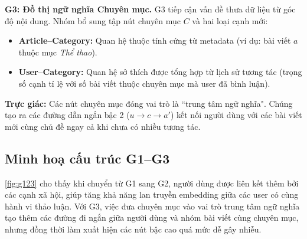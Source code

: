 \documentclass[11pt]{article}
\begin{document}
\textbf{G3: Đồ thị ngữ nghĩa Chuyên mục.}
G3 tiếp cận vấn đề thưa dữ liệu từ góc độ nội dung. Nhóm bổ sung tập nút chuyên mục $C$ và hai loại cạnh mới:
\begin{itemize}
    \item \textbf{Article--Category:} Quan hệ thuộc tính cứng từ metadata (ví dụ: bài viết $a$ thuộc mục \textit{Thể thao}).
    \item \textbf{User--Category:} Quan hệ sở thích được tổng hợp từ lịch sử tương tác (trọng số cạnh tỉ lệ với số bài viết thuộc chuyên mục mà user đã bình luận).
\end{itemize}
\textbf{Trực giác:} Các nút chuyên mục đóng vai trò là ``trung tâm ngữ nghĩa". Chúng tạo ra các đường dẫn ngắn bậc 2 ($u \to c \to a'$) kết nối người dùng với các bài viết mới cùng chủ đề ngay cả khi chưa có nhiều tương tác.
\subsection{Minh hoạ cấu trúc G1--G3}
\autoref{fig:g123} cho thấy khi chuyển từ G1 sang G2, người dùng được liên kết thêm bởi các cạnh xã hội, giúp tăng khả năng lan truyền embedding giữa các user có cùng hành vi thảo luận. Với G3, việc đưa chuyên mục vào vai trò trung tâm ngữ nghĩa tạo thêm các đường đi ngắn giữa người dùng và nhóm bài viết cùng chuyên mục, nhưng đồng thời làm xuất hiện các nút bậc cao quá mức dễ gây nhiễu.
\end{document}
